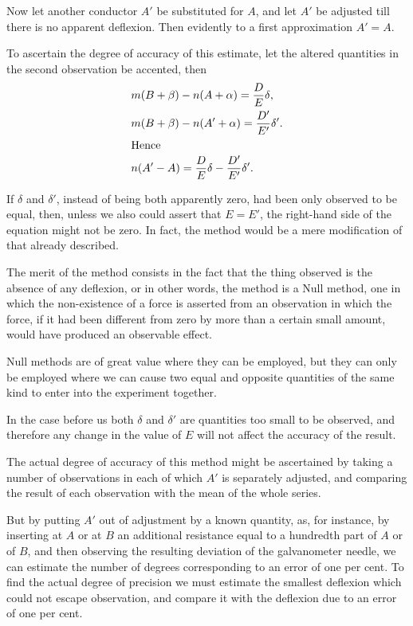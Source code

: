\documentclass[12pt,oneside]{book}[2021/10/04]
\newcommand{\Runhead}[1]{\fancyhead[C]{\iffloatpage{}{\small#1}}}
\newcommand{\¬}{\hphantom{0}}
\begin{document}
Now let another conductor \(A'\) be substituted for \(A\), and let \(A'\) be
adjusted till there is no apparent deflexion. Then evidently to a
first approximation \(A' = A\).

To ascertain the degree of accuracy of this estimate, let the
altered quantities in the second observation be accented, then
\begin{align*}
&m(B + \beta) - n( A + \alpha ) = \frac{D}{E} \delta\text{,}\\
&m(B + \beta) - n( A' + \alpha ) = \frac{D'}{E'} \delta'\text{.}\\
\shortintertext{Hence}
&n(A' - A) = \frac{D}{E} \delta - \frac{D'}{E'} \delta'\text{.}
\end{align*}

If \(\delta\) and \(\delta'\), instead of being both apparently zero, had been only
observed to be equal, then, unless we also could assert that \(E = E'\),
the right-hand side of the equation might not be zero. In fact, the
method would be a mere modification of that already described.

\hypertarget{220:1}{}
The merit of the method consists in the fact that the thing
observed is the absence of any deflexion, or in other words, the
method is a Null method, one in which the non-existence of a force
is asserted from an observation in which the force, if it had been
different from zero by more than a certain small amount, would
have produced an observable effect.

Null methods are of great value where they can be employed,
but they can only be employed where we can cause two equal and
opposite quantities of the same kind to enter into the experiment
together.

In the case before us both \(\delta\) and \(\delta'\) are quantities too small to be
observed, and therefore any change in the value of \(E\) will not affect
the accuracy of the result.
\Runhead{MEASUREMENT OF RESISTANCE.}

The actual degree of accuracy of this method might be ascertained
by taking a number of observations in each of which \(A'\)
is separately adjusted, and comparing the result of each observation
with the mean of the whole series.

But by putting \(A'\) out of adjustment by a known quantity, as,
for instance, by inserting at \(A\) or at \(B\) an additional resistance
equal to a hundredth part of \(A\) or of \(B\), and then observing
the resulting deviation of the galvanometer needle, we can estimate
the number of degrees corresponding to an error of one per cent.
To find the actual degree of precision we must estimate the smallest
deflexion which could not escape observation, and compare it with
the deflexion due to an error of one per cent.
\end{document}
